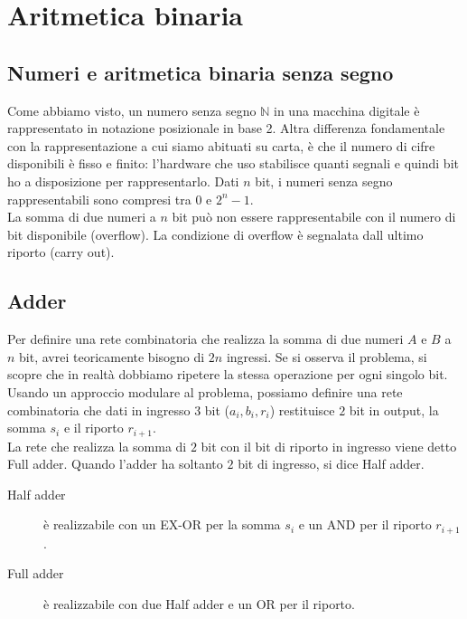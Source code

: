 \documentclass{subfiles}
\begin{document}
\section{Aritmetica binaria}

\subsection{Numeri e aritmetica binaria senza segno}

Come abbiamo visto, un numero senza segno $\mathbb{N}$ in una macchina digitale è rappresentato in notazione posizionale in base 2.
Altra differenza fondamentale con la rappresentazione a cui siamo abituati su carta, è che il numero di cifre disponibili è fisso e finito:
l’hardware che uso stabilisce quanti segnali e quindi bit ho a disposizione per rappresentarlo.
Dati $n$ bit, i numeri senza segno rappresentabili sono compresi tra $0$ e $2^n - 1$.\\

\noindent
La somma di due numeri a $n$ bit può non essere rappresentabile con il numero di bit disponibile (overflow).
La condizione di overflow è segnalata dall ultimo riporto (carry out).

\subsection{Adder}

Per definire una rete combinatoria che realizza la somma di due numeri $A$ e $B$ a $n$ bit, avrei teoricamente bisogno di $2n$ ingressi.
Se si osserva il problema, si scopre che in realtà dobbiamo ripetere la stessa operazione per ogni singolo bit.
Usando un approccio modulare al problema, possiamo definire una rete combinatoria che dati in ingresso $3$ bit ($a_i, b_i, r_i$) restituisce $2$ bit in output, la somma $s_i$ e il riporto $r_{i+1}$.\\

\noindent
La rete che realizza la somma di $2$ bit con il bit di riporto in ingresso viene detto Full adder.
Quando l'adder ha soltanto $2$ bit di ingresso, si dice Half adder.

\begin{description}
    \item[Half adder] è realizzabile con un EX-OR per la somma $s_i$ e un AND per il riporto $r_{i+1}$.
    \item[Full adder] è realizzabile con due Half adder e un OR per il riporto.
\end{description}
\end{document}

